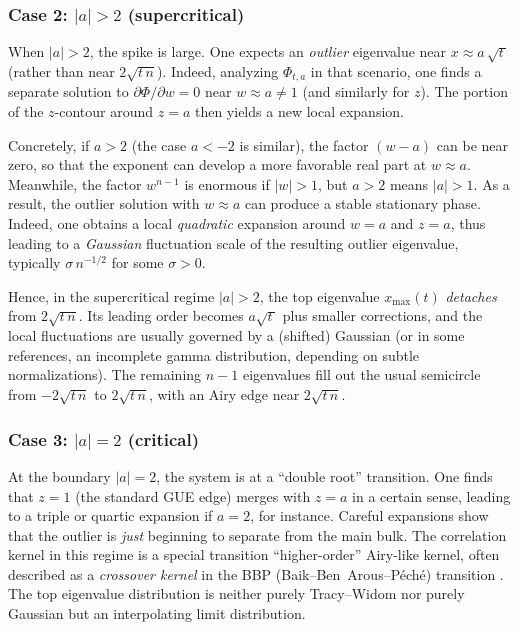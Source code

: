 \documentclass[letterpaper,11pt,oneside,reqno]{article}
\numberwithin{equation}{section}
\theoremstyle{definition}
\begin{document}
\subsubsection{Case 2: \texorpdfstring{$|a|>2$}{|a| > 2} (supercritical)}

When $|a|>2$, the spike is large.  One expects an \emph{outlier} eigenvalue near $x\approx a\,\sqrt{t\,}$ (rather than near $2\sqrt{t\,n}$).  Indeed, analyzing $\Phi_{t,a}$ in that scenario, one finds a separate solution to $\partial\Phi/\partial w=0$ near $w\approx a\neq 1$ (and similarly for $z$).  The portion of the $z$-contour around $z= a$ then yields a new local expansion.  

Concretely, if $a>2$ (the case $a<-2$ is similar), the factor $(w-a)$ can be near zero, so that the exponent can develop a more favorable real part at $w\approx a$.  Meanwhile, the factor $w^{n-1}$ is enormous if $|w|>1$, but $a>2$ means $|a|>1$.  As a result, the outlier solution with $w\approx a$ can produce a stable stationary phase.  Indeed, one obtains a local \emph{quadratic} expansion around $w=a$ and $z=a$, thus leading to a \emph{Gaussian} fluctuation scale of the resulting outlier eigenvalue, typically $\sigma\,n^{-1/2}$ for some $\sigma>0$.  

Hence, in the supercritical regime $|a|>2$, the top eigenvalue $x_{\max}(t)$ \emph{detaches} from $2\sqrt{t\,n}$.  Its leading order becomes $a\sqrt{t\,}$ plus smaller corrections, and the local fluctuations are usually governed by a (shifted) Gaussian (or in some references, an incomplete gamma distribution, depending on subtle normalizations).  The remaining $n-1$ eigenvalues fill out the usual semicircle from $-2\sqrt{t\,n}$ to $2\sqrt{t\,n}$, with an Airy edge near $2\sqrt{t\,n}$.  

\subsubsection{Case 3: \texorpdfstring{$|a|=2$}{|a|=2} (critical)}

At the boundary $|a|=2$, the system is at a ``double root'' transition.  One finds that $z=1$ (the standard GUE edge) merges with $z=a$ in a certain sense, leading to a triple or quartic expansion if $a=2$, for instance.  Careful expansions show that the outlier is \emph{just} beginning to separate from the main bulk.  The correlation kernel in this regime is a special transition “higher-order” Airy-like kernel, often described as a \emph{crossover kernel} in the BBP (Baik--Ben~Arous--P\'ech\'e) transition \cite{BBP2005phase}.  The top eigenvalue distribution is neither purely Tracy--Widom nor purely Gaussian but an interpolating limit distribution.  
\end{document}
